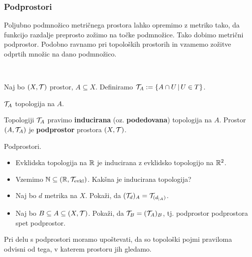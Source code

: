\subsubsection{Podprostori}
Poljubno podmnožico metričnega prostora lahko opremimo z metriko tako, da funkcijo razdalje preprosto zožimo na točke podmnožice. Tako dobimo metrični podprostor. Podobno ravnamo pri topoloških prostorih in vzamemo zožitve odprtih množic na dano podmnožico.

\,

Naj bo $(X, \mathcal{T})$ prostor, $A \subseteq X$. Definiramo $\mathcal{T}_A := \{A \cap U \,|\, U \in T\}$.

\begin{trditev}
    $\mathcal{T}_A$ topologija na $A$.
\end{trditev}

\begin{definicija}
    Topologiji $\mathcal{T}_A$ pravimo \textbf{inducirana} (oz. \textbf{podedovana}) topologija na $A$.
    Prostor $(A, \mathcal{T}_A)$ je \textbf{podprostor} prostora $(X, \mathcal{T})$.
\end{definicija}

\begin{primer}
    Podprostori.
    \begin{itemize}
        \item Evklidska topologija na $\mathbb{R}$ je inducirana z evklidsko topologijo na $\mathbb{R}^2$.
        \item Vzemimo $\mathbb{N} \subseteq (\mathbb{R}, \mathcal{T}_\text{evkl})$. Kakšna je inducirana topologija?
        \item Naj bo $d$ metrika na $X$. Pokaži, da $(\mathcal{T}_d)_A = \mathcal{T}_{(d_{|A})}$.        
        \item Naj bo $B \subseteq A \subseteq (X, \mathcal{T})$. Pokaži, da $\mathcal{T}_B = (\mathcal{T}_A)_B$, tj. podprostor podprostora spet podprostor.
    \end{itemize}
\end{primer}

\begin{opomba}
    Pri delu s podprostori moramo upoštevati, da so topološki pojmi praviloma odvisni od tega, v katerem prostoru jih gledamo.
\end{opomba}

